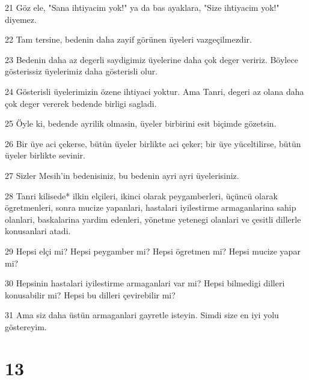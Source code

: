 \par 21 Göz ele, "Sana ihtiyacim yok!" ya da bas ayaklara, "Size ihtiyacim yok!" diyemez.
\par 22 Tam tersine, bedenin daha zayif görünen üyeleri vazgeçilmezdir.
\par 23 Bedenin daha az degerli saydigimiz üyelerine daha çok deger veririz. Böylece gösterissiz üyelerimiz daha gösterisli olur.
\par 24 Gösterisli üyelerimizin özene ihtiyaci yoktur. Ama Tanri, degeri az olana daha çok deger vererek bedende birligi sagladi.
\par 25 Öyle ki, bedende ayrilik olmasin, üyeler birbirini esit biçimde gözetsin.
\par 26 Bir üye aci çekerse, bütün üyeler birlikte aci çeker; bir üye yüceltilirse, bütün üyeler birlikte sevinir.
\par 27 Sizler Mesih'in bedenisiniz, bu bedenin ayri ayri üyelerisiniz.
\par 28 Tanri kilisede* ilkin elçileri, ikinci olarak peygamberleri, üçüncü olarak ögretmenleri, sonra mucize yapanlari, hastalari iyilestirme armaganlarina sahip olanlari, baskalarina yardim edenleri, yönetme yetenegi olanlari ve çesitli dillerle konusanlari atadi.
\par 29 Hepsi elçi mi? Hepsi peygamber mi? Hepsi ögretmen mi? Hepsi mucize yapar mi?
\par 30 Hepsinin hastalari iyilestirme armaganlari var mi? Hepsi bilmedigi dilleri konusabilir mi? Hepsi bu dilleri çevirebilir mi?
\par 31 Ama siz daha üstün armaganlari gayretle isteyin. Simdi size en iyi yolu göstereyim.

\chapter{13}

